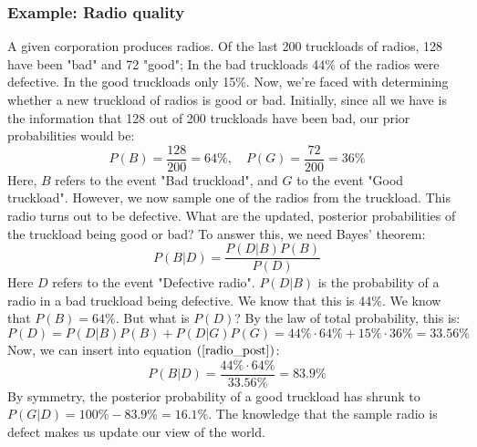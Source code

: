\documentclass[12pt, a4paper]{article}
\begin{document}
\subsubsection{Example: Radio quality}
A given corporation produces radios. Of the last 200 truckloads of radios, 128 have been "bad" and 72 "good"; In the bad truckloads 44\% of the radios were defective. In the good truckloads only 15\%. Now, we're faced with determining whether a new truckload of radios is good or bad. Initially, since all we have is the information that 128 out of 200 truckloads have been bad, our prior probabilities would be:
\begin{equation}
P(B)=\frac{128}{200}=64\%,\quad P(G)=\frac{72}{200}=36\%
\end{equation}
Here, $B$ refers to the event "Bad truckload", and $G$ to the event "Good truckload". However, we now sample one of the radios from the truckload. This radio turns out to be defective. What are the updated, posterior probabilities of the truckload being good or bad? To answer this, we need Bayes' theorem:
\begin{equation}
\label{radio_post}
P(B|D)=\frac{P(D|B)P(B)}{P(D)}
\end{equation}
Here $D$ refers to the event "Defective radio". $P(D|B)$ is the probability of a radio in a bad truckload being defective. We know that this is 44\%. We know that $P(B)=64\%$. But what is $P(D)$? By the law of total probability, this is:
\begin{equation}
P(D)=P(D|B)P(B)+P(D|G)P(G)=44\%\cdot 64\% + 15\%\cdot 36\% = 33.56\%
\end{equation}
Now, we can insert into equation $(\ref{radio_post})$:
\begin{equation}
P(B|D)=\frac{44\%\cdot 64\%}{33.56\%}=83.9\%
\end{equation}
By symmetry, the posterior probability of a good truckload has shrunk to $P(G|D)=100\%-83.9\%=16.1\%$. The knowledge that the sample radio is defect makes us update our view of the world.
\end{document}
